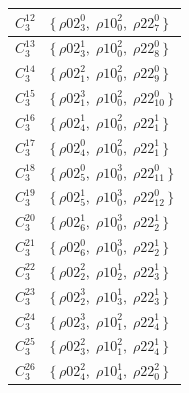 \begin{longtable}{|c|l|}
  $C_{3}^{12}$ &
  $\{\, \rho02_{3}^{0},\; \rho10_{0}^{2},\; \rho22_{7}^{0} \,\}$ \\
  \hline

  $C_{3}^{13}$ &
  $\{\, \rho02_{3}^{1},\; \rho10_{0}^{2},\; \rho22_{8}^{0} \,\}$ \\
  \hline

  $C_{3}^{14}$ &
  $\{\, \rho02_{1}^{2},\; \rho10_{0}^{2},\; \rho22_{9}^{0} \,\}$ \\
  \hline

  $C_{3}^{15}$ &
  $\{\, \rho02_{1}^{3},\; \rho10_{0}^{2},\; \rho22_{10}^{0} \,\}$ \\
  \hline

  $C_{3}^{16}$ &
  $\{\, \rho02_{4}^{1},\; \rho10_{0}^{2},\; \rho22_{1}^{1} \,\}$ \\
  \hline

  $C_{3}^{17}$ &
  $\{\, \rho02_{4}^{0},\; \rho10_{0}^{2},\; \rho22_{1}^{1} \,\}$ \\
  \hline

  $C_{3}^{18}$ &
  $\{\, \rho02_{5}^{0},\; \rho10_{0}^{3},\; \rho22_{11}^{0} \,\}$ \\
  \hline

  $C_{3}^{19}$ &
  $\{\, \rho02_{5}^{1},\; \rho10_{0}^{3},\; \rho22_{12}^{0} \,\}$ \\
  \hline

  $C_{3}^{20}$ &
  $\{\, \rho02_{6}^{1},\; \rho10_{0}^{3},\; \rho22_{2}^{1} \,\}$ \\
  \hline

  $C_{3}^{21}$ &
  $\{\, \rho02_{6}^{0},\; \rho10_{0}^{3},\; \rho22_{2}^{1} \,\}$ \\
  \hline

  $C_{3}^{22}$ &
  $\{\, \rho02_{2}^{2},\; \rho10_{2}^{1},\; \rho22_{3}^{1} \,\}$ \\
  \hline

  $C_{3}^{23}$ &
  $\{\, \rho02_{2}^{3},\; \rho10_{3}^{1},\; \rho22_{3}^{1} \,\}$ \\
  \hline

  $C_{3}^{24}$ &
  $\{\, \rho02_{3}^{3},\; \rho10_{1}^{2},\; \rho22_{4}^{1} \,\}$ \\
  \hline

  $C_{3}^{25}$ &
  $\{\, \rho02_{3}^{2},\; \rho10_{1}^{2},\; \rho22_{4}^{1} \,\}$ \\
  \hline

  $C_{3}^{26}$ &
  $\{\, \rho02_{4}^{2},\; \rho10_{4}^{1},\; \rho22_{0}^{2} \,\}$ \\
  \hline


\end{longtable}
